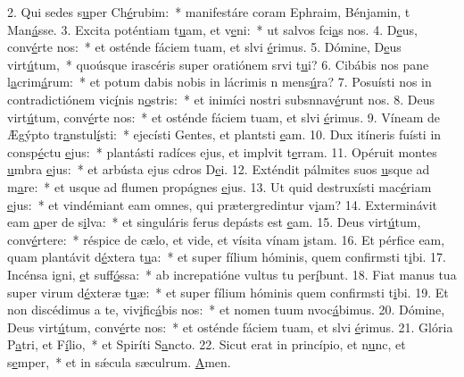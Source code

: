 2. Qui sedes s\uline{u}per Ch\uline{é}rubim:~* manifestáre coram Ephraim, Bénjamin, t Man\uline{á}sse.
3. Excita poténtiam t\uline{u}am, et v\uline{e}ni:~* ut salvos fci\uline{a}s nos.
4. D\uline{e}us, conv\uline{é}rte nos:~* et osténde fáciem tuam, et slvi \uline{é}rimus.
5. Dómine, D\uline{e}us virt\uline{ú}tum,~* quoúsque irascéris super oratiónem srvi t\uline{u}i?
6. Cibábis nos pane l\uline{a}crim\uline{á}rum:~* et potum dabis nobis in lácrimis n mens\uline{ú}ra?
7. Posuísti nos in contradictiónem vic\uline{í}nis n\uline{o}stris:~* et inimíci nostri subsnnav\uline{é}runt nos.
8. Deus virt\uline{ú}tum, conv\uline{é}rte nos:~* et osténde fáciem tuam, et slvi \uline{é}rimus.
9. Víneam de Ægýpto tr\uline{a}nstul\uline{í}sti:~* ejecísti Gentes, et plantsti \uline{e}am.
10. Dux itíneris fuísti in consp\uline{é}ctu \uline{e}jus:~* plantásti radíces ejus, et implvit t\uline{e}rram.
11. Opéruit montes \uline{u}mbra \uline{e}jus:~* et arbústa ejus cdros D\uline{e}i.
12. Exténdit pálmites suos \uline{u}sque ad m\uline{a}re:~* et usque ad flumen propágnes \uline{e}jus.
13. Ut quid destruxísti mac\uline{é}riam \uline{e}jus:~* et vindémiant eam omnes, qui prætergredintur v\uline{i}am?
14. Exterminávit eam \uline{a}per de s\uline{i}lva:~* et singuláris ferus depásts est \uline{e}am.
15. Deus virt\uline{ú}tum, conv\uline{é}rtere:~* réspice de cælo, et vide, et vísita vínam \uline{i}stam.
16. Et pérfice eam, quam plantávit d\uline{é}xtera t\uline{u}a:~* et super fílium hóminis, quem confirmsti t\uline{i}bi.
17. Incénsa igni, \uline{e}t suff\uline{ó}ssa:~* ab increpatióne vultus tu per\uline{í}bunt.
18. Fiat manus tua super virum d\uline{é}xteræ t\uline{u}æ:~* et super fílium hóminis quem confirmsti t\uline{i}bi.
19. Et non discédimus a te, viv\uline{i}fic\uline{á}bis nos:~* et nomen tuum nvoc\uline{á}bimus.
20. Dómine, Deus virt\uline{ú}tum, conv\uline{é}rte nos:~* et osténde fáciem tuam, et slvi \uline{é}rimus.
21. Glória P\uline{a}tri, et F\uline{í}lio,~* et Spiríti S\uline{a}ncto.
22. Sicut erat in princípio, et n\uline{u}nc, et s\uline{e}mper,~* et in sǽcula sæculrum. \uline{A}men.
